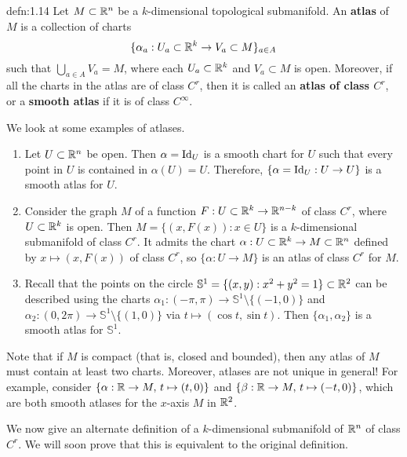 \begin{defn}{defn:1.14}
    Let $M \subset \mathbb{R}^n$ be a $k$-dimensional topological submanifold. 
    An {\bf atlas} of $M$ is a collection of charts 
    \[ \{\alpha_a : U_a \subset \mathbb{R}^k \to V_a \subset M\}_{a \in A} \] 
    such that $\bigcup_{a \in A} V_a = M$, where each $U_a \subset \mathbb{R}^k$ 
    and $V_a \subset M$ is open. Moreover, if all the charts in the atlas 
    are of class $C^r$, then it is called an 
    {\bf atlas of class $C^r$}, or a {\bf smooth atlas} if it is of 
    class $C^\infty$. 
\end{defn}\vspace{-0.25cm}
We look at some examples of atlases. 
\begin{enumerate}[(1)]
    \item Let $U \subset \mathbb{R}^n$ be open. Then $\alpha = \operatorname{Id}_U$ is a smooth 
    chart for $U$ such that every point in $U$ is contained in $\alpha(U) = U$. 
    Therefore, $\{\alpha = \operatorname{Id}_U : U \to U\}$ is a smooth atlas for $U$. 
    \item Consider the graph $M$ of a function $F : U \subset \mathbb{R}^k \to \mathbb{R}^{n-k}$ 
    of class $C^r$, where $U \subset \mathbb{R}^k$ is open. Then 
    $M = \{(x, F(x)) : x \in U\}$ is a $k$-dimensional 
    submanifold of class $C^r$. It admits the chart $\alpha : U \subset \mathbb{R}^k 
    \to M \subset \mathbb{R}^n$ defined by $x \mapsto (x, F(x))$ of class $C^r$, 
    so $\{\alpha : U \to M\}$ is an atlas of class $C^r$ for $M$. 
    \item Recall that the points on the circle $\mathbb{S}^1 = 
    \{(x, y) : x^2 + y^2 = 1\} \subset \mathbb{R}^2$ can be described using 
    the charts $\alpha_1 : (-\pi, \pi) \to \mathbb{S}^1 \setminus \{(-1, 0)\}$ 
    and $\alpha_2 : (0, 2\pi) \to \mathbb{S}^1 \setminus \{(1, 0)\}$ 
    via $t \mapsto (\cos t, \sin t)$. Then $\{\alpha_1, \alpha_2\}$ 
    is a smooth atlas for $\mathbb{S}^1$. 
\end{enumerate}
Note that if $M$ is compact (that is, closed and bounded), then any atlas 
of $M$ must contain at least two charts. Moreover, atlases are not unique in general! 
For example, consider $\{\alpha : \mathbb{R} \to M,\, t \mapsto (t, 0)\}$ 
and $\{\beta : \mathbb{R} \to M,\, t \mapsto (-t, 0)\}$, which are both smooth 
atlases for the $x$-axis $M$ in $\mathbb{R}^2$. 

We now give an alternate definition of a $k$-dimensional submanifold 
of $\mathbb{R}^n$ of class $C^r$. We will soon prove that this is equivalent to the 
original definition.

